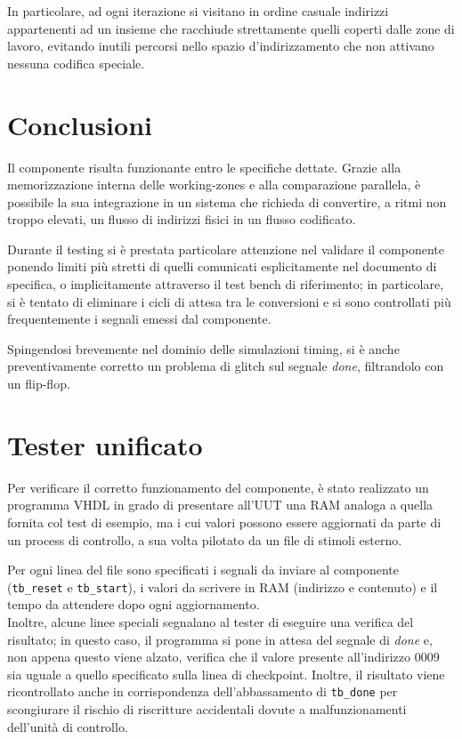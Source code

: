 \documentclass[11pt,a4paper]{article}
\begin{document}
In particolare, ad ogni iterazione si visitano in ordine casuale indirizzi appartenenti ad un insieme che racchiude strettamente quelli coperti dalle
zone di lavoro, evitando inutili percorsi nello spazio d'indirizzamento che non attivano nessuna codifica speciale.

\section{Conclusioni}
Il componente risulta funzionante entro le specifiche dettate. Grazie alla memorizzazione interna delle working-zones e alla comparazione parallela, è
possibile la sua integrazione in un sistema che richieda di convertire, a ritmi non troppo elevati, un flusso di indirizzi fisici in un flusso codificato.

Durante il testing si è prestata particolare attenzione nel validare il componente ponendo limiti più stretti di quelli comunicati esplicitamente nel
documento di specifica, o implicitamente attraverso il test bench di riferimento; in particolare, si è tentato di eliminare i cicli di attesa tra le
conversioni e si sono controllati più frequentemente i segnali emessi dal componente.

Spingendosi brevemente nel dominio delle simulazioni timing, si è anche preventivamente corretto un problema di glitch sul segnale \emph{done}, filtrandolo
con un flip-flop.

\newpage

\appendix
\section{Tester unificato}
\label{appendix:unitest}
Per verificare il corretto funzionamento del componente, è stato realizzato un programma VHDL in grado di presentare all'UUT una RAM analoga a quella
fornita col test di esempio, ma i cui valori possono essere aggiornati da parte di un process di controllo, a sua volta pilotato da un file di stimoli
esterno.

Per ogni linea del file sono specificati i segnali da inviare al componente (\lstinline{tb_reset} e \lstinline{tb_start}), i valori da scrivere in RAM
(indirizzo e contenuto) e il tempo da attendere dopo ogni aggiornamento.\\
Inoltre, alcune linee speciali segnalano al tester di eseguire una verifica del risultato; in questo caso, il programma si pone in attesa del segnale di
\emph{done} e, non appena questo viene alzato, verifica che il valore presente all'indirizzo 0009 sia uguale a quello specificato sulla linea di
checkpoint. Inoltre, il risultato viene ricontrollato anche in corrispondenza dell'abbassamento di \lstinline{tb_done} per scongiurare il rischio di
riscritture accidentali dovute a malfunzionamenti dell'unità di controllo.
\end{document}
